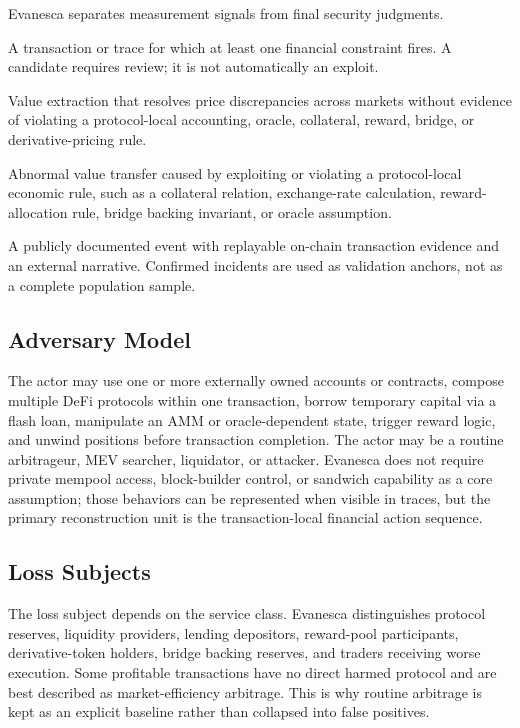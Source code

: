 \documentclass[10pt]{article}
\newcommand{\sys}{Evanesca\xspace}
\begin{document}
\sys separates measurement signals from final security judgments.
\begin{description}[leftmargin=1.3em,style=nextline]
  \item[Candidate event.]
  A transaction or trace for which at least one financial constraint fires. A
  candidate requires review; it is not automatically an exploit.
  \item[Benign arbitrage baseline.]
  Value extraction that resolves price discrepancies across markets without
  evidence of violating a protocol-local accounting, oracle, collateral,
  reward, bridge, or derivative-pricing rule.
  \item[Harmful extraction.]
  Abnormal value transfer caused by exploiting or violating a protocol-local
  economic rule, such as a collateral relation, exchange-rate calculation,
  reward-allocation rule, bridge backing invariant, or oracle assumption.
  \item[Confirmed incident.]
  A publicly documented event with replayable on-chain transaction evidence
  and an external narrative. Confirmed incidents are used as validation anchors,
  not as a complete population sample.
\end{description}

\subsection{Adversary Model}

The actor may use one or more externally owned accounts or contracts, compose
multiple DeFi protocols within one transaction, borrow temporary capital via a
flash loan, manipulate an AMM or oracle-dependent state, trigger reward logic,
and unwind positions before transaction completion. The actor may be a routine
arbitrageur, MEV searcher, liquidator, or attacker. \sys does not require
private mempool access, block-builder control, or sandwich capability as a core
assumption; those behaviors can be represented when visible in traces, but the
primary reconstruction unit is the transaction-local financial action sequence.

\subsection{Loss Subjects}

The loss subject depends on the service class. \sys distinguishes protocol
reserves, liquidity providers, lending depositors, reward-pool participants,
derivative-token holders, bridge backing reserves, and traders receiving worse
execution. Some profitable transactions have no direct harmed protocol and are
best described as market-efficiency arbitrage. This is why routine arbitrage is
kept as an explicit baseline rather than collapsed into false positives.
\end{document}
